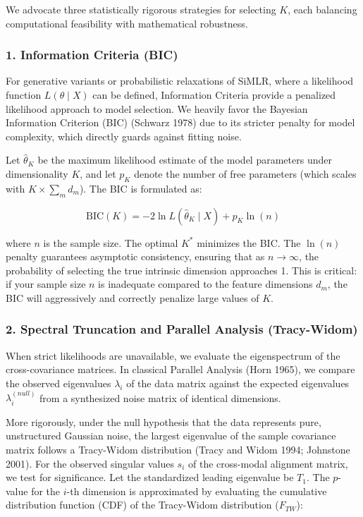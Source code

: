 \documentclass[
  letterpaper,
]{report}
\begin{document}
We advocate three statistically rigorous strategies for selecting \(K\),
each balancing computational feasibility with mathematical robustness.

\subsubsection{1. Information Criteria
(BIC)}\label{information-criteria-bic}

For generative variants or probabilistic relaxations of SiMLR, where a
likelihood function \(L(\theta \mid X)\) can be defined, Information
Criteria provide a penalized likelihood approach to model selection. We
heavily favor the Bayesian Information Criterion (BIC) (Schwarz 1978)
due to its stricter penalty for model complexity, which directly guards
against fitting noise.

Let \(\hat{\theta}_K\) be the maximum likelihood estimate of the model
parameters under dimensionality \(K\), and let \(p_K\) denote the number
of free parameters (which scales with \(K \times \sum_{m} d_m\)). The
BIC is formulated as:

\[
\text{BIC}(K) = -2 \ln L(\hat{\theta}_K \mid X) + p_K \ln(n)
\]

where \(n\) is the sample size. The optimal \(K^*\) minimizes the BIC.
The \(\ln(n)\) penalty guarantees asymptotic consistency, ensuring that
as \(n \to \infty\), the probability of selecting the true intrinsic
dimension approaches 1. This is critical: if your sample size \(n\) is
inadequate compared to the feature dimensions \(d_m\), the BIC will
aggressively and correctly penalize large values of \(K\).

\subsubsection{2. Spectral Truncation and Parallel Analysis
(Tracy-Widom)}\label{spectral-truncation-and-parallel-analysis-tracy-widom}

When strict likelihoods are unavailable, we evaluate the eigenspectrum
of the cross-covariance matrices. In classical Parallel Analysis (Horn
1965), we compare the observed eigenvalues \(\lambda_i\) of the data
matrix against the expected eigenvalues \(\lambda_i^{(null)}\) from a
synthesized noise matrix of identical dimensions.

More rigorously, under the null hypothesis that the data represents
pure, unstructured Gaussian noise, the largest eigenvalue of the sample
covariance matrix follows a Tracy-Widom distribution (Tracy and Widom
1994; Johnstone 2001). For the observed singular values \(s_i\) of the
cross-modal alignment matrix, we test for significance. Let the
standardized leading eigenvalue be \(T_1\). The \(p\)-value for the
\(i\)-th dimension is approximated by evaluating the cumulative
distribution function (CDF) of the Tracy-Widom distribution
(\(F_{TW}\)):
\end{document}
